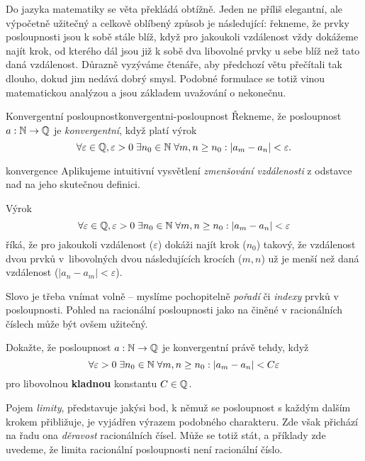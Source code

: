 Do jazyka matematiky se věta  překládá
obtížně. Jeden ne příliš elegantní, ale výpočetně užitečný a celkově oblíbený
způsob je následující: řekneme, že prvky posloupnosti jsou k sobě stále blíž,
když pro jakoukoli vzdálenost vždy dokážeme najít krok, od kterého dál jsou již
k sobě dva libovolné prvky u sebe blíž než tato daná vzdálenost. Důrazně
vyzýváme čtenáře, aby předchozí větu přečítali tak dlouho, dokud jim nedává
dobrý smysl. Podobné formulace se totiž vinou matematickou analýzou a jsou
základem uvažování o nekonečnu.

\begin{definition}{Konvergentní posloupnost}{konvergentni-posloupnost}
 Řekneme, že posloupnost $a:\mathbb{N} \to \mathbb{Q}$ je \emph{konvergentní}, když platí výrok
 \[
  \forall \varepsilon \in \mathbb{Q}, \varepsilon>0 \; \exists n_0 \in \mathbb{N} \; \forall m,n
  \geq n_0: |a_m - a_n| < \varepsilon.
 \]
\end{definition}

\begin{remark}{}{konvergence}
 Aplikujeme intuitivní vysvětlení \emph{zmenšování vzdálenosti} z odstavce nad
  na jeho skutečnou definici.

 Výrok
 \[
  \forall \varepsilon \in \mathbb{Q}, \varepsilon>0 \; \exists n_0 \in \mathbb{N} \; \forall m,n
  \geq n_0: |a_m - a_n| < \varepsilon
 \]
 říká, že pro jakoukoli vzdálenost ($\varepsilon$) dokáži najít krok ($n_0$)
 takový, že vzdálenost dvou prvků v~libovolných dvou následujících krocích
 ($m,n$) už je menší než daná vzdálenost ($|a_n -a_m|<\varepsilon$).

 Slovo  je třeba vnímat volně -- myslíme pochopitelně \emph{pořadí} či
 \emph{indexy} prvků v posloupnosti. Pohled na racionální posloupnosti jako na
  činěné v racionálních číslech může být ovšem užitečný.
\end{remark}

\begin{exercise}{}{}
 Dokažte, že posloupnost $a:\mathbb{N} \to \mathbb{Q}$ je konvergentní právě tehdy, když
 \[
  \forall \varepsilon>0 \; \exists n_0 \in \mathbb{N} \; \forall m,n \geq n_0: |a_m -
  a_n| < C\varepsilon
 \]
 pro libovolnou \textbf{kladnou} konstantu $C \in \mathbb{Q}$.
\end{exercise}

Pojem \emph{limity}, představuje jakýsi bod, k němuž se posloupnost s každým
dalším krokem přibližuje, je vyjádřen výrazem podobného charakteru. Zde však
přichází na řadu ona \emph{děravost} racionálních čísel. Může se totiž stát, a
příklady zde uvedeme, že limita racionální posloupnosti není racionální číslo.

